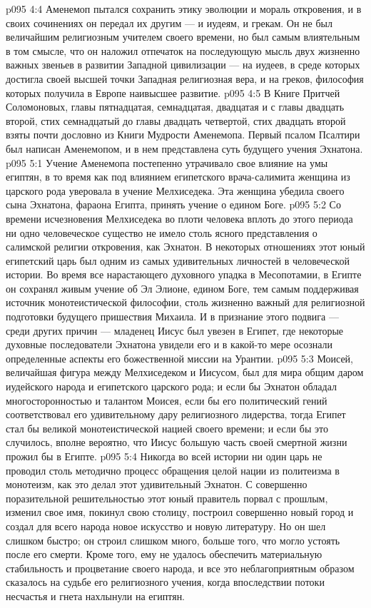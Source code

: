 \vs p095 4:4 Аменемоп пытался сохранить этику эволюции и мораль откровения, и в своих сочинениях он передал их другим --- и иудеям, и грекам. Он не был величайшим религиозным учителем своего времени, но был самым влиятельным в том смысле, что он наложил отпечаток на последующую мысль двух жизненно важных звеньев в развитии Западной цивилизации --- на иудеев, в среде которых достигла своей высшей точки Западная религиозная вера, и на греков, философия которых получила в Европе наивысшее развитие.
\vs p095 4:5 \pc В Книге Притчей Соломоновых, главы пятнадцатая, семнадцатая, двадцатая и с главы двадцать второй, стих семнадцатый до главы двадцать четвертой, стих двадцать второй взяты почти дословно из Книги Мудрости Аменемопа. Первый псалом Псалтири был написан Аменемопом, и в нем представлена суть будущего учения Эхнатона.
\vs p095 5:1 Учение Аменемопа постепенно утрачивало свое влияние на умы египтян, в то время как под влиянием египетского врача\hyp{}салимита женщина из царского рода уверовала в учение Мелхиседека. Эта женщина убедила своего сына Эхнатона, фараона Египта, принять учение о едином Боге.
\vs p095 5:2 Со времени исчезновения Мелхиседека во плоти человека вплоть до этого периода ни одно человеческое существо не имело столь ясного представления о салимской религии откровения, как Эхнатон. В некоторых отношениях этот юный египетский царь был одним из самых удивительных личностей в человеческой истории. Во время все нарастающего духовного упадка в Месопотамии, в Египте он сохранял живым учение об Эл Элионе, едином Боге, тем самым поддерживая источник монотеистической философии, столь жизненно важный для религиозной подготовки будущего пришествия Михаила. И в признание этого подвига --- среди других причин --- младенец Иисус был увезен в Египет, где некоторые духовные последователи Эхнатона увидели его и в какой\hyp{}то мере осознали определенные аспекты его божественной миссии на Урантии.
\vs p095 5:3 Моисей, величайшая фигура между Мелхиседеком и Иисусом, был для мира общим даром иудейского народа и египетского царского рода; и если бы Эхнатон обладал многосторонностью и талантом Моисея, если бы его политический гений соответствовал его удивительному дару религиозного лидерства, тогда Египет стал бы великой монотеистической нацией своего времени; и если бы это случилось, вполне вероятно, что Иисус большую часть своей смертной жизни прожил бы в Египте.
\vs p095 5:4 Никогда во всей истории ни один царь не проводил столь методично процесс обращения целой нации из политеизма в монотеизм, как это делал этот удивительный Эхнатон. С совершенно поразительной решительностью этот юный правитель порвал с прошлым, изменил свое имя, покинул свою столицу, построил совершенно новый город и создал для всего народа новое искусство и новую литературу. Но он шел слишком быстро; он строил слишком много, больше того, что могло устоять после его смерти. Кроме того, ему не удалось обеспечить материальную стабильность и процветание своего народа, и все это неблагоприятным образом сказалось на судьбе его религиозного учения, когда впоследствии потоки несчастья и гнета нахлынули на египтян.
